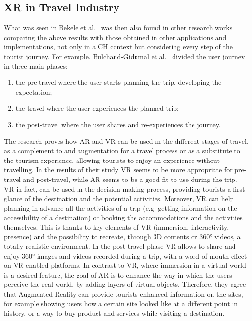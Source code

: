 \subsection{XR in Travel Industry}
What was seen in Bekele et al.~\cite{bekele_survey_2018} was then also found in other research works comparing the above results with those obtained in other applications and implementations, not only in a CH context but considering every step of the tourist journey. For example, Bulchand-Gidumal et al.~\cite{bulchand-gidumal_tourists_2020} divided the user journey in three main phases:
\begin{enumerate}
	\item the pre-travel where the user starts planning the trip, developing the expectation;
	\item the travel where the user experiences the planned trip;
	\item the post-travel where the user shares and re-experiences the journey.
\end{enumerate}

The research proves how AR and VR can be used in the different stages of travel, as a complement to and augmentation for a travel process or as a substitute to the tourism experience, allowing tourists to enjoy an experience without travelling. In the results of their study VR seems to be more appropriate for pre-travel and post-travel, while AR seems to be a good fit to use during the trip. VR in fact, can be used in the decision-making process, providing tourists a first glance of the destination and the potential activities. Moreover, VR can help planning in advance all the activities of a trip (e.g. getting information on the accessibility of a destination) or booking the accommodations and the activities themselves. This is thanks to key elements of VR (immersion, interactivity, presence) and the possibility to recreate, through 3D contents or 360° videos, a totally realistic environment. 
In the post-travel phase VR allows to share and enjoy 360° images and videos recorded during a trip, with a word-of-mouth effect on VR-enabled platforms.
In contrast to VR, where immersion in a virtual world is a desired feature, the goal of AR is to enhance the way in which the users perceive the real world, by adding layers of virtual objects. Therefore, they agree that Augmented Reality can provide tourists enhanced information on the sites, for example showing users how a certain site looked like at a different point in history, or a way to buy product and services while visiting a destination.

